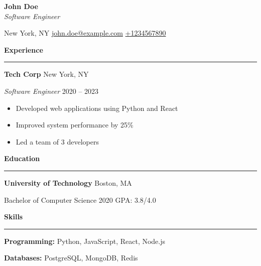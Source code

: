 \documentclass[letterpaper,11pt]{article}
\renewcommand{\section}[1]{%
  \vspace{16pt}%
  \begin{center}%
    {\Large\bfseries #1}%
    \vspace{2pt}%
    \hrule%
  \end{center}%
  \vspace{10pt}%
}
\begin{document}
\begin{center}
    {\Large\textbf{John Doe}}\\[6pt]
    {\normalsize\textit{Software Engineer}}\\[6pt]
    \hrulefill
\end{center}
\begin{center}
    New York, NY {\large\textbullet} \href{mailto:john.doe@example.com}{john.doe@example.com} {\large\textbullet} \href{tel:+1234567890}{+1234567890}
\end{center}


\section{Experience}
\textbf{Tech Corp} \hfill New York, NY

\textit{Software Engineer} \hfill 2020 -- 2023

\begin{itemize}[leftmargin=*,itemsep=2pt,parsep=2pt,topsep=4pt]
    \item Developed web applications using Python and React
    \item Improved system performance by 25\%
    \item Led a team of 3 developers
\end{itemize}

\section{Education}
\textbf{University of Technology} \hfill Boston, MA

Bachelor of Computer Science \hfill 2020
GPA: 3.8/4.0

\section{Skills}
\textbf{Programming:} Python, JavaScript, React, Node.js

\textbf{Databases:} PostgreSQL, MongoDB, Redis
\end{document}
